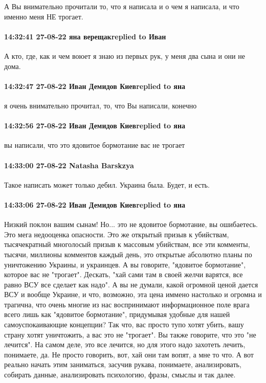 А Вы внимательно прочитали то, что я написала и о чем я написала, и что именно
меня НЕ трогает.

\paragraph{14:32:41 27-08-22 яна верещакreplied to Иван}

А кто, где, как и чем воюет я знаю из первых рук, у меня два сына и они не
дома.

\paragraph{14:32:47 27-08-22 Иван Демидов Киевreplied to яна}

я очень внимательно прочитал, то, что Вы написали, конечно

\paragraph{14:32:56 27-08-22 Иван Демидов Киевreplied to яна}

вы написали, что это ядовитое бормотание вас не трогает

\paragraph{14:33:00 27-08-22 Natasha Barskzya}

Такое написать может только дебил. Украина была. Будет, и есть.

\paragraph{14:33:06 27-08-22 Иван Демидов Киевreplied to яна}

Низкий поклон вашим сынам! Но... это не ядовитое бормотание, вы ошибаетесь. Это
мега недооценка опасности. Это же открытый призыв к убийствам, тысячекратный
многолосый призыв к массовым убийствам, все эти комменты, тысячи, миллионы
комментов каждый день, это открытые абсолютно планы по уничтожению Украины, и
украинцев. А вы говорите, "ядовитое бормотание", которое вас не "трогает".
Дескать, "хай сами там в своей желчи варятся, все равно ВСУ все сделает как
надо". А вы не думали, какой огромной ценой дается ВСУ и вообще Украине, и что,
возможно, эта цена иммено настолько и огромна и трагична, что очень многие из
нас воспринимают информационное поле врага всего лишь как "ядовитое
бормотание", придумывая удобные для нашей самоуспокаивающие концепции? Так что,
вас просто тупо хотят убить, вашу страну хотят уничтожить, а вас это не
"трогает". Вы также говорите, что это "не лечится". На самом деле, это все
лечится, но для этого надо захотеть лечить, понимаете, да. Не просто говорить,
вот, хай они там вопят, а мне то что. А вот реально начать этим заниматься,
засучив рукава, понимаете, анализировать, собирать данные, анализировать
психологию, фразы, смыслы и так далее.
